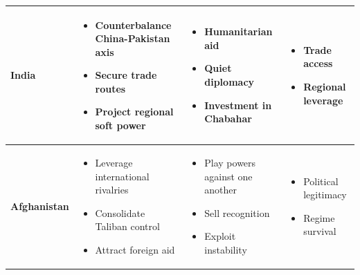 \documentclass[11pt]{article}
\begin{document}
\begin{longtable}{|p{2.5cm}|p{4.5cm}|p{4.5cm}|p{4.5cm}|}
\textbf{India} &
\begin{itemize}[leftmargin=*]
\item Counterbalance China-Pakistan axis
\item Secure trade routes
\item Project regional soft power
\end{itemize} &
\begin{itemize}[leftmargin=*]
\item Humanitarian aid
\item Quiet diplomacy
\item Investment in Chabahar
\end{itemize} &
\begin{itemize}[leftmargin=*]
\item Trade access
\item Regional leverage
\end{itemize} \\
\hline

\textbf{Afghanistan} &
\begin{itemize}[leftmargin=*]
\item Leverage international rivalries
\item Consolidate Taliban control
\item Attract foreign aid
\end{itemize} &
\begin{itemize}[leftmargin=*]
\item Play powers against one another
\item Sell recognition
\item Exploit instability
\end{itemize} &
\begin{itemize}[leftmargin=*]
\item Political legitimacy
\item Regime survival
\end{itemize} \\
\hline
\end{longtable}
\end{document}
